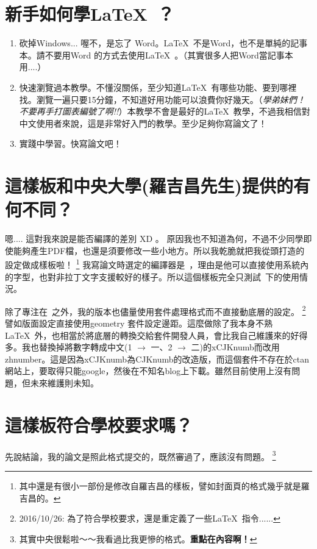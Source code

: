 \documentclass[class=NCU_thesis, crop=false, float=true]{standalone}
\begin{document}
\section{新手如何學\LaTeX\ ？}
\begin{enumerate}
    \item 砍掉Windows... 喔不，是忘了 Word。\LaTeX\ 不是Word，也不是單純的記事本。請不要用Word 的方式去使用\LaTeX\ 。（其實很多人把Word當記事本用....）
    \item 快速瀏覽過本教學。不懂沒關係，至少知道\LaTeX\ 有哪些功能、要到哪裡找。瀏覽一遍只要15分鐘，不知道好用功能可以浪費你好幾天。（\emph{學弟妹們！不要再手打圖表編號了啊!!}）本教學不會是最好的\LaTeX\ 教學，不過我相信對中文使用者來說，這是非常好入門的教學。至少足夠你寫論文了！
    \item 實踐中學習。快寫論文吧！
\end{enumerate}

\section{這樣板和中央大學(羅吉昌先生)提供的有何不同？}
嗯.... 這對我來說是能否編譯的差別 XD 。 原因我也不知道為何，不過不少同學即使能夠產生PDF檔，也還是須要修改一些小地方。所以我乾脆就把我從頭打造的設定做成樣板啦！
\footnote{其中還是有很小一部份是修改自羅吉昌的樣板，譬如封面頁的格式幾乎就是羅吉昌的。}
我寫論文時選定的編譯器是\XeLaTeX\  ，理由是他可以直接使用系統內的字型，也對非拉丁文字支援較好的樣子。所以這個樣板完全只測試\XeLaTeX\ 下的使用情況。

除了專注在\XeLaTeX\ 之外，我的版本也儘量使用套件處理格式而不直接動底層的設定。
\footnote{2016/10/26: 為了符合學校要求，還是重定義了一些\LaTeX\ 指令......}
譬如版面設定直接使用geometry 套件設定邊距。這麼做除了我本身不熟\LaTeX\ 外，也相當於將底層的轉換交給套件開發人員，會比我自己維護來的好得多。我也替換掉將數字轉成中文(1 $\rightarrow$ 一、2 $\rightarrow$ 二)的xCJKnumb而改用zhnumber。這是因為xCJKnumb為CJKnumb的改造版，而這個套件不存在於ctan網站上，要取得只能google，然後在不知名blog上下載。雖然目前使用上沒有問題，但未來維護則未知。

\section{這樣板符合學校要求嗎？}
先說結論，我的論文是照此格式提交的，既然審過了，應該沒有問題。
\footnote{其實中央很鬆啦～～我看過比我更慘的格式。\textbf{重點在內容啊！}}
\end{document}

